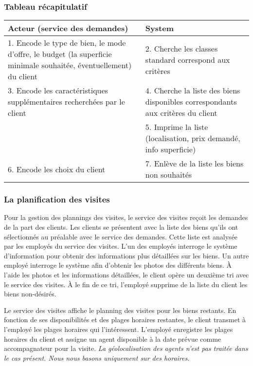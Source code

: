 \subsubsection*{Tableau récapitulatif}
\begin{longtable}{|p{7.5cm}|p{7.5cm}|}
\hline
Acteur (service des demandes)& System\\
\hline
1. Encode le type de bien, le mode d'offre, le budget (la superficie minimale souhaitée, éventuellement) du client & 2. Cherche les classes standard correspond aux critères\\
3. Encode les caractéristiques supplémentaires recherchées par le client & 4. Cherche la liste des biens disponibles correspondants aux critères du client\\
& 5. Imprime la liste (localisation, prix demandé, info superficie)\\
6. Encode les choix du client & 7. Enlève de la liste les biens non souhaités\\
\hline
\end{longtable}

\subsubsection{La planification des visites}
Pour la gestion des plannings des visites, le service des visites reçoit les demandes de la part des clients.
Les clients se présentent avec la liste des biens qu'ils ont sélectionnés au préalable avec le service des demandes.
Cette liste est analysée par les employés du service des visites. L'un des employés interroge le système d'information pour obtenir des informations plus détaillées sur les biens. Un autre employé interroge le système afin d'obtenir les photos des différents biens.
À l'aide les photos et les informations détaillées, le client opère un deuxième tri avec le service des visites. À le fin de ce tri, l'employé supprime de la liste du client les biens non-désirés.

Le service des visites affiche le planning des visites pour les biens restants.
En fonction de ses disponibilités et des plages horaires restantes, le client transmet à l'employé les plages horaires qui l'intéressent. L'employé enregistre les plages horaires du client et assigne un agent disponible à la date prévue comme accompagnateur pour la visite.
\emph{La géolocalisation des agents n'est pas traitée dans le cas présent. Nous nous basons uniquement sur des horaires.}

